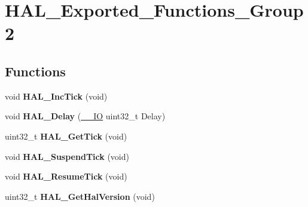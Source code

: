 \hypertarget{group___h_a_l___exported___functions___group2}{}\section{H\+A\+L\+\_\+\+Exported\+\_\+\+Functions\+\_\+\+Group2}
\label{group___h_a_l___exported___functions___group2}
\subsection*{Functions}
\begin{DoxyCompactItemize}
\item 
void {\bfseries H\+A\+L\+\_\+\+Inc\+Tick} (void)\hypertarget{group___h_a_l___exported___functions___group2_gaa8361d44d76b7f6256834f828165837a}{}\label{group___h_a_l___exported___functions___group2_gaa8361d44d76b7f6256834f828165837a}

\item 
void {\bfseries H\+A\+L\+\_\+\+Delay} (\hyperlink{core__sc300_8h_aec43007d9998a0a0e01faede4133d6be}{\+\_\+\+\_\+\+IO} uint32\+\_\+t Delay)\hypertarget{group___h_a_l___exported___functions___group2_gad0304dec8e33aca8c99e2836947b76d6}{}\label{group___h_a_l___exported___functions___group2_gad0304dec8e33aca8c99e2836947b76d6}

\item 
uint32\+\_\+t {\bfseries H\+A\+L\+\_\+\+Get\+Tick} (void)\hypertarget{group___h_a_l___exported___functions___group2_gaf2c4f03d53e997a54e1fd5e80daa55c4}{}\label{group___h_a_l___exported___functions___group2_gaf2c4f03d53e997a54e1fd5e80daa55c4}

\item 
void {\bfseries H\+A\+L\+\_\+\+Suspend\+Tick} (void)\hypertarget{group___h_a_l___exported___functions___group2_gaaf651af2afe688a991c657f64f8fa5f9}{}\label{group___h_a_l___exported___functions___group2_gaaf651af2afe688a991c657f64f8fa5f9}

\item 
void {\bfseries H\+A\+L\+\_\+\+Resume\+Tick} (void)\hypertarget{group___h_a_l___exported___functions___group2_ga24e0ee9dae1ec0f9d19200f5575ff790}{}\label{group___h_a_l___exported___functions___group2_ga24e0ee9dae1ec0f9d19200f5575ff790}

\item 
uint32\+\_\+t {\bfseries H\+A\+L\+\_\+\+Get\+Hal\+Version} (void)\hypertarget{group___h_a_l___exported___functions___group2_gafb139b375512ad2a234e4619b129b966}{}\label{group___h_a_l___exported___functions___group2_gafb139b375512ad2a234e4619b129b966}


\end{DoxyCompactItemize}
